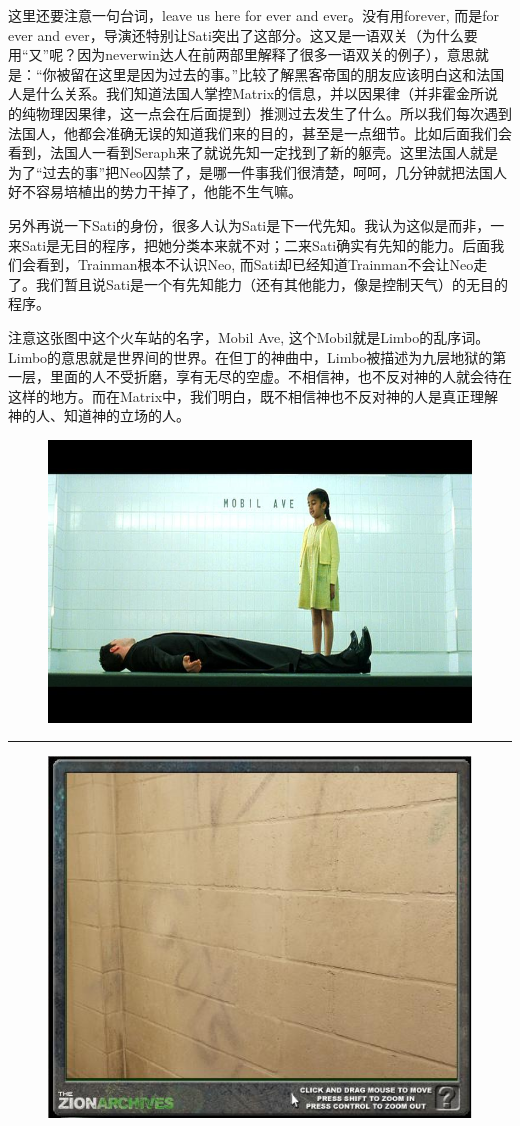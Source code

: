 \documentclass[UTF8]{ctexart}
\newcommand{\myparsep}{\noindent \rule[0.5ex]{\linewidth}{1pt}}
\begin{document}
这里还要注意一句台词，leave us here for ever and ever。没有用forever, 而是for ever and ever，导演还特别让Sati突出了这部分。这又是一语双关（为什么要用“又”呢？因为neverwin达人在前两部里解释了很多一语双关的例子），意思就是：“你被留在这里是因为过去的事。”比较了解黑客帝国的朋友应该明白这和法国人是什么关系。我们知道法国人掌控Matrix的信息，并以因果律（并非霍金所说的纯物理因果律，这一点会在后面提到）推测过去发生了什么。所以我们每次遇到法国人，他都会准确无误的知道我们来的目的，甚至是一点细节。比如后面我们会看到，法国人一看到Seraph来了就说先知一定找到了新的躯壳。这里法国人就是为了“过去的事”把Neo囚禁了，是哪一件事我们很清楚，呵呵，几分钟就把法国人好不容易培植出的势力干掉了，他能不生气嘛。

另外再说一下Sati的身份，很多人认为Sati是下一代先知。我认为这似是而非，一来Sati是无目的程序，把她分类本来就不对；二来Sati确实有先知的能力。后面我们会看到，Trainman根本不认识Neo, 而Sati却已经知道Trainman不会让Neo走了。我们暂且说Sati是一个有先知能力（还有其他能力，像是控制天气）的无目的程序。

注意这张图中这个火车站的名字，Mobil Ave, 这个Mobil就是Limbo的乱序词。Limbo的意思就是世界间的世界。在但丁的神曲中，Limbo被描述为九层地狱的第一层，里面的人不受折磨，享有无尽的空虚。不相信神，也不反对神的人就会待在这样的地方。而在Matrix中，我们明白，既不相信神也不反对神的人是真正理解神的人、知道神的立场的人。

\begin{figure}[htb]
\centering
\includegraphics[width=0.5\linewidth]{fig/e36b4a3679b53bdda3cc2b19.jpg}
\end{figure}

\myparsep

\begin{figure}[htb]
\centering
\includegraphics[width=0.5\linewidth]{fig/43ead53fab4bbcc27c1e7125.jpg}
\end{figure}
\end{document}
